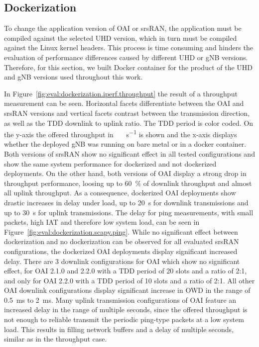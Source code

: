 \subsection{Dockerization}\label{sec:eval:docker}

To change the application version of OAI or srsRAN, the application must be compiled against the selected
\gls{UHD} version, which in turn must be compiled against the Linux kernel headers.
This process is time consuming and hinders the evaluation of performance differences caused by different
\gls{UHD} or \gls{gNB} versions.
Therefore, for this section, we built Docker container for the product of the \gls{UHD} and \gls{gNB} versions used
throughout this work.

In Figure~\ref{fig:eval:dockerization.iperf.throughput} the result of a throughput measurement can be seen.
Horizontal facets differentiate between the OAI and srsRAN versions and vertical facets contrast between
the transmission direction, as well as the \gls{TDD} downlink to uplink ratio.
The \gls{TDD} period is color coded. On the y-axis the offered throughput in \SI{}{\mega\bit\per\second} is shown
and the x-axis displays whether the deployed \gls{gNB} was running on bare metal or in a docker container.
Both versions of srsRAN show no significant effect in all tested configurations and show the same system performance
for dockerized and not dockerized deployments.
On the other hand, both versions of OAI display a strong drop in throughput performance, loosing up to \SI{60}{\percent}
of downlink throughput and almost all uplink throughput.
As a consequence, dockerized OAI deployments show drastic increases in delay under load, up to \SI{20}{\second} for
downlink transmissions and up to \SI{30}{\second} for uplink transmissions.
The delay for ping measurements, with small packets, high \gls{IAT} and therefore low system load, can be seen in
Figure~\ref{fig:eval:dockerization.scapy.ping}.
While no significant effect between dockerization and no dockerization can be observed for all
evaluated srsRAN configurations, the dockerized OAI deployments display significant increased delay.
There are 3 downlink configurations for OAI which show no significant effect, for OAI 2.1.0 and 2.2.0 with a
\gls{TDD} period of 20 slots and a ratio of 2:1, and only for OAI 2.2.0 with a \gls{TDD} period of 10 slots and a ratio of 2:1.
All other OAI downlink configurations display significant increase in \gls{OWD} in the range of \SI{0.5}{\milli\second}
to \SI{2}{\milli\second}.
Many uplink transmission configurations of OAI feature an increased delay in the range of multiple seconds, since
the offered throughput is not enough to reliable transmit the periodic ping-type packets at a low system load.
This results in filling network buffers and a delay of multiple seconds, similar as in the throughput case.

